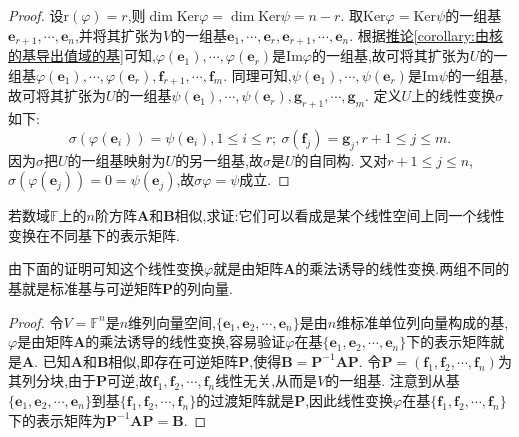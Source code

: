 \documentclass[../../main.tex]{subfiles}%
\begin{document}
\begin{proof}
设\(\text{r}(\varphi)=r\),则\(\dim\text{Ker}\varphi=\dim\text{Ker}\psi=n - r\). 取\(\text{Ker}\varphi=\text{Ker}\psi\)的一组基\(\boldsymbol{e}_{r + 1},\cdots,\boldsymbol{e}_n\),并将其扩张为\(V\)的一组基\(\boldsymbol{e}_1,\cdots,\boldsymbol{e}_r,\boldsymbol{e}_{r + 1},\cdots,\boldsymbol{e}_n\). 根据\hyperref[corollary:由核的基导出值域的基]{推论\ref{corollary:由核的基导出值域的基}}可知,\(\varphi(\boldsymbol{e}_1),\cdots,\varphi(\boldsymbol{e}_r)\)是\(\text{Im}\varphi\)的一组基,故可将其扩张为\(U\)的一组基\(\varphi(\boldsymbol{e}_1),\cdots,\varphi(\boldsymbol{e}_r),\boldsymbol{f}_{r + 1},\cdots,\boldsymbol{f}_m\). 同理可知,\(\psi(\boldsymbol{e}_1),\cdots,\psi(\boldsymbol{e}_r)\)是\(\text{Im}\psi\)的一组基,故可将其扩张为\(U\)的一组基\(\psi(\boldsymbol{e}_1),\cdots,\psi(\boldsymbol{e}_r),\boldsymbol{g}_{r + 1},\cdots,\boldsymbol{g}_m\). 定义\(U\)上的线性变换\(\sigma\)如下:
\[
\sigma(\varphi(\boldsymbol{e}_i))=\psi(\boldsymbol{e}_i),1\leqslant  i\leqslant  r;\ \sigma(\boldsymbol{f}_j)=\boldsymbol{g}_j,r + 1\leqslant  j\leqslant  m.
\]
因为\(\sigma\)把\(U\)的一组基映射为\(U\)的另一组基,故\(\sigma\)是\(U\)的自同构. 又对\(r + 1\leqslant  j\leqslant  n\),\(\sigma(\varphi(\boldsymbol{e}_j))=0=\psi(\boldsymbol{e}_j)\),故\(\sigma\varphi=\psi\)成立. 
\end{proof}

\begin{proposition}\label{proposition:相似矩阵可看作一个线性变换在不同基下的表示矩阵}
若数域\(\mathbb{F}\)上的\(n\)阶方阵\(\boldsymbol{A}\)和\(\boldsymbol{B}\)相似,求证:它们可以看成是某个线性空间上同一个线性变换在不同基下的表示矩阵.
\end{proposition}
\begin{note}
由下面的证明可知这个线性变换\(\varphi\)就是由矩阵\(\boldsymbol{A}\)的乘法诱导的线性变换.两组不同的基就是标准基与可逆矩阵\(\boldsymbol{P}\)的列向量.
\end{note}
\begin{proof}
令\(V = \mathbb{F}^n\)是\(n\)维列向量空间,\(\{\boldsymbol{e}_1,\boldsymbol{e}_2,\cdots,\boldsymbol{e}_n\}\)是由\(n\)维标准单位列向量构成的基,\(\varphi\)是由矩阵\(\boldsymbol{A}\)的乘法诱导的线性变换,容易验证\(\varphi\)在基\(\{\boldsymbol{e}_1,\boldsymbol{e}_2,\cdots,\boldsymbol{e}_n\}\)下的表示矩阵就是\(\boldsymbol{A}\). 已知\(\boldsymbol{A}\)和\(\boldsymbol{B}\)相似,即存在可逆矩阵\(\boldsymbol{P}\),使得\(\boldsymbol{B}=\boldsymbol{P}^{-1}\boldsymbol{A}\boldsymbol{P}\).
令\(\boldsymbol{P}=(\boldsymbol{f}_1,\boldsymbol{f}_2,\cdots,\boldsymbol{f}_n)\)为其列分块,由于\(\boldsymbol{P}\)可逆,故\(\boldsymbol{f}_1,\boldsymbol{f}_2,\cdots,\boldsymbol{f}_n\)线性无关,从而是\(V\)的一组基. 注意到从基\(\{\boldsymbol{e}_1,\boldsymbol{e}_2,\cdots,\boldsymbol{e}_n\}\)到基\(\{\boldsymbol{f}_1,\boldsymbol{f}_2,\cdots,\boldsymbol{f}_n\}\)的过渡矩阵就是\(\boldsymbol{P}\),因此线性变换\(\varphi\)在基\(\{\boldsymbol{f}_1,\boldsymbol{f}_2,\cdots,\boldsymbol{f}_n\}\)下的表示矩阵为\(\boldsymbol{P}^{-1}\boldsymbol{A}\boldsymbol{P}=\boldsymbol{B}\). 
\end{proof}
\end{document}
